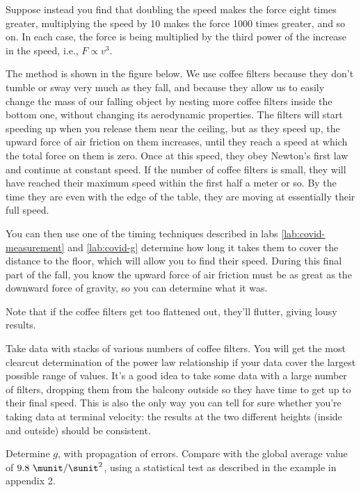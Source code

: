 Suppose instead you find that doubling the speed makes the
force eight times greater, multiplying the speed by 10 makes
the force 1000 times greater, and so on. In each case, the
force is being multiplied by the third power of the increase
in the speed, i.e., $F\propto v^3$.

\observations

The method is shown in the figure below. We use coffee
filters because they don't tumble or sway very much as they
fall, and because they allow us to easily change the mass of
our falling object by nesting more coffee filters inside the
bottom one, without changing its aerodynamic properties.
The filters will start speeding up when you release them
near the ceiling, but as they speed up, the upward force of
air friction on them increases, until they reach a speed at
which the total force on them is zero. Once at this speed,
they obey Newton's first law and continue at constant speed.
If the number of coffee filters is small,
they will have reached their maximum speed within the first
half a meter or so. By the time they are even with the edge
of the table, they are moving at essentially their full
speed.

You can then use one of the timing techniques described in labs \ref{lab:covid-measurement} and
\ref{lab:covid-g} determine how long
it takes them to cover the distance to the floor, which will
allow you to find their speed. During this final part of the
fall, you know the upward force of air friction must be as
great as the downward force of gravity, so you can
determine what it was.


Note that if the coffee filters get too flattened out,
they'll flutter, giving lousy results.

Take data with stacks of various numbers of coffee filters.
You will get the most clearcut determination of the power
law relationship if your data cover the largest possible
range of values. It's a good idea to take some data with a
large number of filters, dropping them from the balcony
outside so they have time to get up to their final speed.
This is also the only way you can tell for sure whether you're
taking data at terminal velocity: the results at the two different
heights (inside and outside) should be consistent.


\analysis

Determine $g$, with propagation of errors. Compare with the global average value of $9.8\ \munit/\sunit^2$,
using a statistical test as described in the example in appendix 2.

